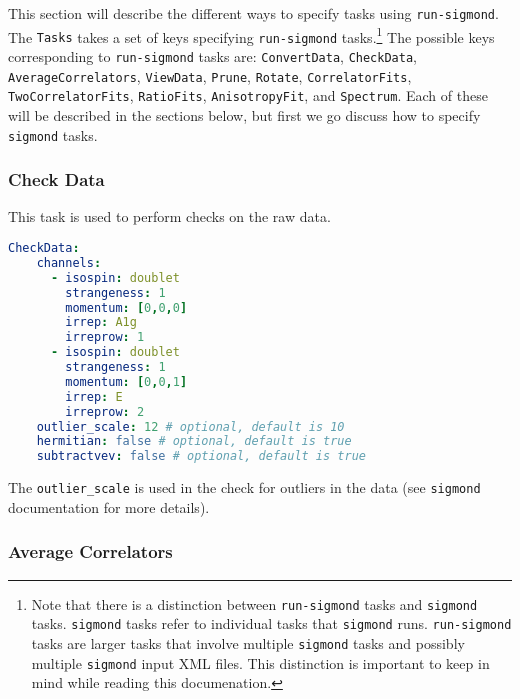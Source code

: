 \documentclass[12pt,letterpaper,notitlepage]{article}
\newcommand{\key}[1]{\textcolor{Emerald}{\texttt{\small{#1}}}}
\newcommand{\runsigmond}{\texttt{run-sigmond}}
\newcommand{\sigmond}{\texttt{sigmond}}
\begin{document}
This section will describe the different ways to specify tasks using \texttt{run-sigmond}.
The \key{Tasks} takes a set of keys specifying \runsigmond{} tasks.\footnote{
  Note that there is a distinction between \runsigmond{} tasks and \sigmond{} tasks.
  \sigmond{} tasks refer to individual tasks that \sigmond{} runs.
  \runsigmond{} tasks are larger tasks that involve multiple \sigmond{} tasks and possibly multiple \sigmond{} input \textsc{XML} files.
  This distinction is important to keep in mind while reading this documenation.
}
The possible keys corresponding to \runsigmond{} tasks are:
\key{ConvertData}, \key{CheckData}, \key{AverageCorrelators}, \key{ViewData}, \key{Prune}, \key{Rotate},
\key{CorrelatorFits}, \key{TwoCorrelatorFits}, \key{RatioFits}, \key{AnisotropyFit}, and \key{Spectrum}.
Each of these will be described in the sections below, but first we go discuss how to specify \sigmond{} tasks.

\subsubsection{Check Data}

This task is used to perform checks on the raw data.

\begin{lstlisting}[language=yaml]
  CheckData:
    channels: 
      - isospin: doublet
        strangeness: 1
        momentum: [0,0,0]
        irrep: A1g
        irreprow: 1
      - isospin: doublet
        strangeness: 1
        momentum: [0,0,1]
        irrep: E
        irreprow: 2
    outlier_scale: 12 # optional, default is 10
    hermitian: false # optional, default is true
    subtractvev: false # optional, default is true
\end{lstlisting}
The \key{outlier\_scale} is used in the check for outliers in the data (see \sigmond{} documentation for more details).

\subsubsection{Average Correlators}
\end{document}
